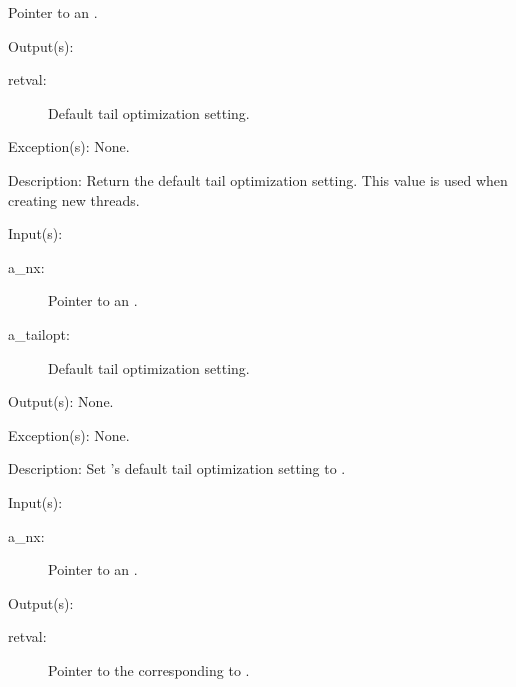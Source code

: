 \begin{capi}
\begin{capilist}
\begin{description}
			Pointer to an .
		\end{description}
	\item[Output(s): ]
		\begin{description}\item[]
		\item[retval: ]
			Default tail optimization setting.
		\end{description}
	\item[Exception(s): ] None.
	\item[Description: ]
		Return the default tail optimization setting.  This value is
		used when creating new threads.
	\end{capilist}
\label{nx_tailopt_set}
	\begin{capilist}
	\item[Input(s): ]
		\begin{description}\item[]
		\item[a\_nx: ]
			Pointer to an .
		\item[a\_tailopt: ]
			Default tail optimization setting.
		\end{description}
	\item[Output(s): ] None.
	\item[Exception(s): ] None.
	\item[Description: ]
		Set 's default tail optimization setting to
		.
	\end{capilist}
\label{nx_systemdict_get}
	\begin{capilist}
	\item[Input(s): ]
		\begin{description}\item[]
		\item[a\_nx: ]
			Pointer to an \classname{nx}.
		\end{description}
	\item[Output(s): ]
		\begin{description}\item[]
		\item[retval: ]
			Pointer to the  corresponding to
			\onyxop{systemdict}{}.
		\end{description}

\end{capilist}
\end{capi}
